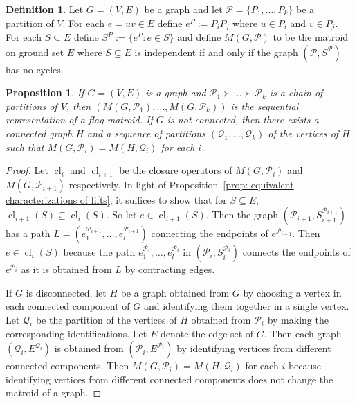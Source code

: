\documentclass[12pt]{article}
\newtheorem{prop}[thm]{Proposition}
\theoremstyle{definition}
\newtheorem{defn}[thm]{Definition}
\DeclareMathOperator{\cl}{cl}
\begin{document}
\begin{defn}\label{defn: graphicl flag matroids}
    Let $G = (V,E)$ be a graph and let $\mathcal{P} = \{P_1,\dots,P_k\}$ be a partition of $V$.
    For each $e = uv \in E$ define $e^P := P_i P_j$ where $u \in P_i$ and $v \in P_j$.
    For each $S \subseteq E$ define $S^P := \{e^P : e \in S\}$
    and define $M(G,\mathcal{P})$ to be the matroid on ground set $E$ where $S \subseteq E$ is independent
    if and only if the graph $(\mathcal{P},S^\mathcal{P})$ has no cycles.
\end{defn}

\begin{prop}\label{prop: graphic flag matroids are flag matroids}
    If $G = (V,E)$ is a graph and $\mathcal{P}_1 \succ \dots \succ \mathcal{P}_k$ is a chain of partitions of $V$,
    then $(M(G,\mathcal{P}_1),\dots,M(G,\mathcal{P}_k))$ is the sequential representation of a flag matroid.
    If $G$ is not connected, then there exists a connected graph $H$ and a sequence of partitions $(\mathcal{Q}_1,\dots,\mathcal{Q}_k)$ of the vertices of $H$ such that
    $M(G,\mathcal{P}_i) = M(H,\mathcal{Q}_i)$ for each $i$.
\end{prop}
\begin{proof}
    Let $\cl_i$ and $\cl_{i+1}$ be the closure operators of $M(G, \mathcal{P}_i)$ and $M(G, \mathcal{P}_{i+1})$ respectively. In light of Proposition~\ref{prop: equivalent characterizations of lifts},
    it suffices to show that for $S \subseteq E$, $\cl_{i+1}(S) \subseteq \cl_i(S)$. So let $e \in \cl_{i+1}(S)$.
    Then the graph $(\mathcal{P}_{i+1},S^{\mathcal{P}_{i+1}}_{i+1})$ has a path $L = (e_1^{\mathcal{P}_{i+1}},\dots,e_l^{\mathcal{P}_{i+1}})$ connecting the endpoints of $e^{\mathcal{P}_{i+1}}$.
    Then $e \in \cl_{i}(S)$ because the path $e_1^{\mathcal{P}_{i}},\dots,e_l^{\mathcal{P}_i}$ in $(\mathcal{P}_{i},S^{\mathcal{P}_i}_{i})$
    connects the endpoints of $e^{\mathcal{P}_{i}}$ as it is obtained from $L$ by contracting edges.

    If $G$ is disconnected, let $H$ be a graph obtained from $G$ by choosing a vertex in each connected component of $G$ and identifying them together in a single vertex.
    Let $\mathcal{Q}_i$ be the partition of the vertices of $H$ obtained from $\mathcal{P}_i$
    by making the corresponding identifications.
    Let $E$ denote the edge set of $G$.
    Then each graph $(\mathcal{Q}_i,E^{\mathcal{Q}_i})$ is obtained from $(\mathcal{P}_i,E^{\mathcal{P}_i})$ by identifying vertices from different connected components.
    Then $M(G,\mathcal{P}_i) = M(H,\mathcal{Q}_i)$ for each $i$ because identifying vertices from different connected components does not change the matroid of a graph.
\end{proof}
\end{document}
